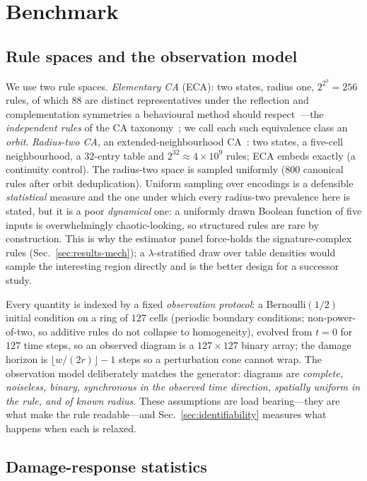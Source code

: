 \documentclass[aip,cha,amsmath,amssymb,reprint,floatfix]{revtex4-2}
\begin{document}
\section{Benchmark}
\label{sec:methods}

\subsection{Rule spaces and the observation model}
We use two rule spaces. \emph{Elementary CA} (ECA): two states, radius one,
$2^{2^3}=256$ rules, of which $88$ are distinct representatives under the
reflection and complementation symmetries a behavioural method should
respect~\cite{lipackard1990}---the \emph{independent rules} of the CA
taxonomy~\cite{rollier2025taxonomy}; we call each such equivalence class an
\emph{orbit}.
\emph{Radius-two CA}, an extended-neighbourhood
CA~\cite{rollier2025taxonomy}: two states, a five-cell neighbourhood, a $32$-entry table
and $2^{32}\approx4\times10^{9}$ rules; ECA embeds exactly (a continuity
control). The radius-two space is sampled uniformly ($800$ canonical rules after
orbit deduplication). Uniform sampling over encodings is a defensible
\emph{statistical} measure and the one under which every radius-two prevalence
here is stated, but it is a poor \emph{dynamical} one: a uniformly drawn
Boolean function of five inputs is overwhelmingly chaotic-looking, so
structured rules are rare by construction. This is why the estimator panel
force-holds the signature-complex rules (Sec.~\ref{sec:results-mech}); a
$\lambda$-stratified draw over table densities would sample the interesting
region directly and is the better design for a successor study.

Every quantity is indexed by a fixed \emph{observation protocol}: a
Bernoulli$(1/2)$ initial condition on a ring of $127$ cells (periodic
boundary conditions; non-power-of-two, so additive rules do not collapse to
homogeneity), evolved from $t=0$ for $127$ time steps, so an observed diagram
is a $127\times127$ binary array; the
damage horizon is $\lfloor w/(2r)\rfloor-1$ steps so a perturbation cone cannot
wrap. The observation model deliberately matches the generator: diagrams are
\emph{complete, noiseless, binary, synchronous in the observed time direction,
spatially uniform in the rule, and of known radius}. These assumptions are load
bearing---they are what make the rule readable---and
Sec.~\ref{sec:identifiability} measures what happens when each is relaxed.

\subsection{Damage-response statistics}
\label{sec:targets}
\end{document}
